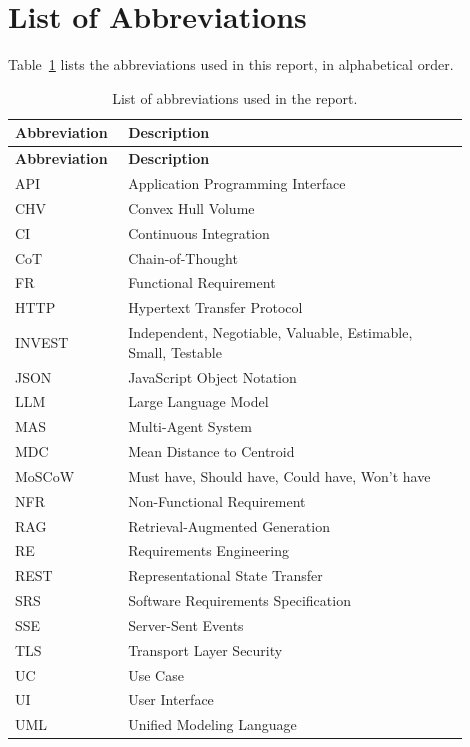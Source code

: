 \section*{\Huge List of Abbreviations}

Table~\ref{tab:abbreviations} lists the abbreviations used in this report, in alphabetical order.

\begingroup{}
\renewcommand{\thetable}{0.\arabic{table}}
\begin{longtable}{|p{0.2\linewidth}|p{0.7\linewidth}|}
    \caption{List of abbreviations used in the report.}
    \label{tab:abbreviations} \\
    \hline
    \textbf{Abbreviation} & \textbf{Description} \\
    \hline
    \endfirsthead
    \hline
    \textbf{Abbreviation} & \textbf{Description} \\
    \hline
    \endhead
    API & Application Programming Interface \\ \hline
    CHV & Convex Hull Volume \\ \hline
    CI & Continuous Integration \\ \hline
    CoT & Chain-of-Thought \\ \hline
    FR & Functional Requirement \\ \hline
    HTTP & Hypertext Transfer Protocol \\ \hline
    INVEST & Independent, Negotiable, Valuable, Estimable, Small, Testable \\ \hline
    JSON & JavaScript Object Notation \\ \hline
    LLM & Large Language Model \\ \hline
    MAS & Multi-Agent System \\ \hline
    MDC & Mean Distance to Centroid \\ \hline
    MoSCoW & Must have, Should have, Could have, Won't have \\ \hline
    NFR & Non-Functional Requirement \\ \hline
    RAG & Retrieval-Augmented Generation \\ \hline
    RE & Requirements Engineering \\ \hline
    REST & Representational State Transfer \\ \hline
    SRS & Software Requirements Specification \\ \hline
    SSE & Server-Sent Events \\ \hline
    TLS & Transport Layer Security \\ \hline
    UC & Use Case \\ \hline
    UI & User Interface \\ \hline
    UML & Unified Modeling Language \\ \hline
\end{longtable}
\endgroup
